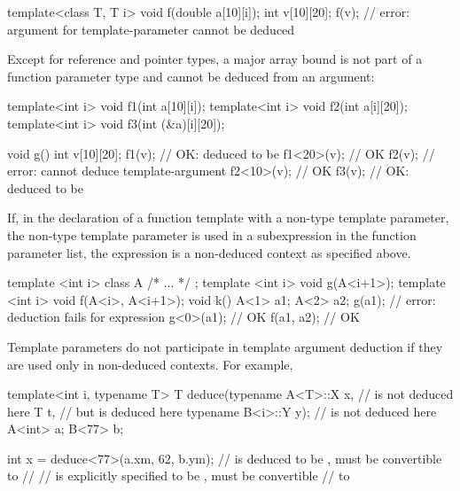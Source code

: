 \pnum
\enterexample
\begin{codeblock}
template<class T, T i> void f(double a[10][i]);
int v[10][20];
f(v);               // error: argument for template-parameter  cannot be deduced
\end{codeblock}
\exitexample

\pnum
\enternote
Except for reference and pointer types, a major array bound is not part of a
function parameter type and cannot be deduced from an argument:

\begin{codeblock}
template<int i> void f1(int a[10][i]);
template<int i> void f2(int a[i][20]);
template<int i> void f3(int (&a)[i][20]);

void g() {
  int v[10][20];
  f1(v);            // OK:  deduced to be 
  f1<20>(v);        // OK
  f2(v);            // error: cannot deduce template-argument 
  f2<10>(v);        // OK
  f3(v);            // OK:  deduced to be 
}
\end{codeblock}

\pnum
If, in the declaration of a function template with a non-type
template parameter, the non-type template parameter
is used in a subexpression in the function parameter list,
the expression is a non-deduced context as specified above.
\enterexample
\begin{codeblock}
template <int i> class A { /* ... */ };
template <int i> void g(A<i+1>);
template <int i> void f(A<i>, A<i+1>);
void k() {
  A<1> a1;
  A<2> a2;
  g(a1);            // error: deduction fails for expression 
  g<0>(a1);         // OK
  f(a1, a2);        // OK
}
\end{codeblock}
\exitexample
\exitnote
\enternote
Template parameters do not participate in template argument deduction if
they are used only in non-deduced contexts.
For example,

\begin{codeblock}
template<int i, typename T>
T deduce(typename A<T>::X x,    //  is not deduced here
  T t,                          // but  is deduced here
  typename B<i>::Y y);          //  is not deduced here
A<int> a;
B<77>  b;

int    x = deduce<77>(a.xm, 62, b.ym);
//  is deduced to be ,  must be convertible to
// 
//  is explicitly specified to be ,  must be convertible
// to 
\end{codeblock}
\exitnote

